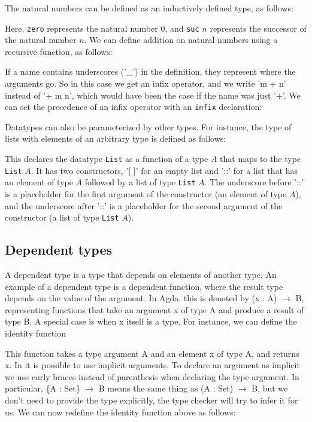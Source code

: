 \documentclass[titlepage]{article}
\begin{document}
The natural numbers can be defined as an inductively defined type, as follows:

Here, \texttt{zero} represents the natural number $0$, and \texttt{suc} $n$ represents the successor of the natural number $n$. We can define addition on natural numbers using a recursive function, as follows:


If a name contains underscores ('\_') in the definition, they represent where the arguments go. So in this case we get an infix operator, and we write 'm + n' instead of '+ m n', which would have been the case if the name was just '+'. We can set the precedence of an infix operator with an \texttt{infix} declaration:


Datatypes can also be parameterized by other types. For instance, the type of lists with elements of an arbitrary type is defined as follows:

This declares the datatype \texttt{List} as a function of a type $A$ that maps to the type \texttt{List} $A$. It has two constructors, '[ ]' for an empty list and '::' for a list that has an element of type $A$ followed by a list of type \texttt{List} $A$. The underscore before '::' is a placeholder for the first argument of the constructor (an element of type $A$), and the underscore after '::' is a placeholder for the second argument of the constructor (a list of type \texttt{List} $A$).


\subsection{Dependent types}

A dependent type is a type that depends on elements of another type. An example of a dependent type is a dependent function, where the result type depends on the value of the argument.  In Agda, this is denoted by (x : A) $\to$ B, representing functions that take an argument x of type A and produce a result of type B. A special case is when x itself is a type. For instance, we can define the identity function

This function takes a type argument A and an element x of type A, and returns x. In \Agda it is possible to use implicit arguments. To declare an argument as implicit we use curly braces instead of parenthesis when declaring the type argument. In particular, \{A : Set\} $\to$ B means the same thing as (A : Set) $\to$ B, but we don't need to provide the type explicitly, the type checker will try to infer it for us. We can now redefine the identity function above as follows:
\end{document}
